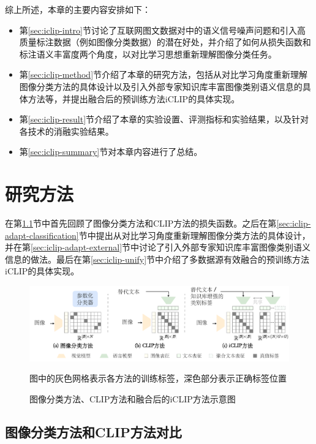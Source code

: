 综上所述，本章的主要内容安排如下：
\begin{itemize}
    \item 第\ref{sec:iclip-intro}节讨论了互联网图文数据对中的语义信号噪声问题和引入高质量标注数据（例如图像分类数据）的潜在好处，并介绍了如何从损失函数和标注语义丰富度两个角度，以对比学习思想重新理解图像分类任务。
    \item 第\ref{sec:iclip-method}节介绍了本章的研究方法，包括从对比学习角度重新理解图像分类方法的具体设计以及引入外部专家知识库丰富图像类别语义信息的具体方法等，并提出融合后的预训练方法iCLIP的具体实现。
    \item 第\ref{sec:iclip-result}节介绍了本章的实验设置、评测指标和实验结果，以及针对各技术的消融实验结果。
    \item 第\ref{sec:iclip-summary}节对本章内容进行了总结。
\end{itemize}

\section{研究方法}
在第\ref{sec:iclip-compare}节中首先回顾了图像分类方法和CLIP方法的损失函数。之后在第\ref{sec:iclip-adapt-classification}节中提出从对比学习角度重新理解图像分类方法的具体设计，并在第\ref{sec:iclip-adapt-external}节中讨论了引入外部专家知识库丰富图像类别语义信息的做法。最后在第\ref{sec:iclip-unify}节中介绍了多数据源有效融合的预训练方法iCLIP的具体实现。

\label{sec:iclip-method}
\begin{figure}
  \centering
  \includegraphics[width=1.0\linewidth]{figures/iclip-compare.pdf}
  \caption*{图中的灰色网格表示各方法的训练标签，深色部分表示正确标签位置}
  \caption{图像分类方法、CLIP方法和融合后的iCLIP方法示意图}
  \label{fig:iclip-compare}
\end{figure}
\subsection{图像分类方法和CLIP方法对比}
\label{sec:iclip-compare}
